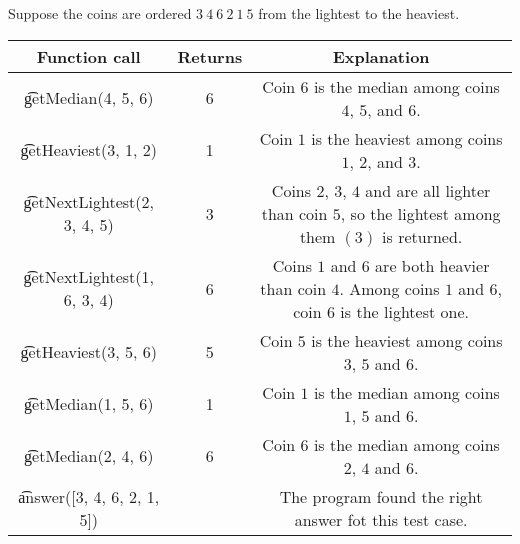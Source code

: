 Suppose the coins are ordered $3\ 4\ 6\ 2\ 1\ 5$ from the lightest to the heaviest.
\begin{center}
\renewcommand{\arraystretch}{1.5}
\begin{tabular}{ |c|c|c| }
\hline
Function call & Returns & Explanation\\
\hline
\t{getMedian(4, 5, 6)} & 6 & Coin $6$ is the median among coins $4$, $5$, and $6$.\\
\hline
\t{getHeaviest(3, 1, 2)} & 1 & Coin $1$ is the heaviest among coins $1$, $2$, and $3$.\\
\hline
\t{getNextLightest(2, 3, 4, 5)} & 3 & \parbox{10cm}{\centering \vspace{2mm}Coins $2$, $3$, $4$ and are all lighter than coin $5$, so the lightest among them $(3)$ is returned. \\\vspace{2mm}}\\
\hline
\t{getNextLightest(1, 6, 3, 4)} & 6 & \parbox{10cm}{\centering \vspace{2mm}Coins $1$ and $6$ are both heavier than coin $4$. Among coins $1$ and $6$, coin $6$ is the lightest one. \\\vspace{2mm}}\\
\hline
\t{getHeaviest(3, 5, 6)} & 5 & Coin $5$ is the heaviest among coins $3$, $5$ and $6$.\\
\hline
\t{getMedian(1, 5, 6)} & 1 & Coin $1$ is the median among coins $1$, $5$ and $6$.\\
\hline
\t{getMedian(2, 4, 6)} & 6 & Coin $6$ is the median among coins $2$, $4$ and $6$.\\
\hline
\t{answer([3, 4, 6, 2, 1, 5])} &  &The program found the right answer fot this test case.\\
\hline
\end{tabular}
\end{center}

